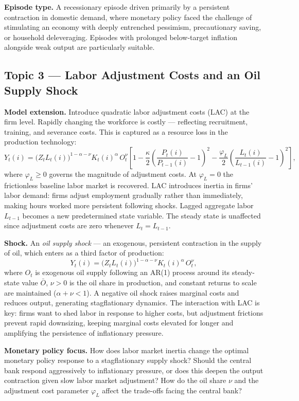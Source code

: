 \documentclass[11pt, a4paper]{article}
\begin{document}
\textbf{Episode type.} A recessionary episode driven primarily by a persistent
contraction in domestic demand, where monetary policy faced the challenge of
stimulating an economy with deeply entrenched pessimism, precautionary saving,
or household deleveraging. Episodes with prolonged below-target inflation
alongside weak output are particularly suitable.

\subsection{Topic 3 --- Labor Adjustment Costs and an Oil Supply Shock}

\textbf{Model extension.} Introduce quadratic labor adjustment costs (LAC) at
the firm level. Rapidly changing the workforce is costly --- reflecting
recruitment, training, and severance costs. This is captured as a resource loss
in the production technology:
\[
    Y_t(i) = \bigl(Z_t L_t(i)\bigr)^{1-\alpha-\nu}
    K_t(i)^\alpha\, O_t^\nu
    \left[1 - \frac{\kappa}{2}
    \left(\frac{P_t(i)}{P_{t-1}(i)} - 1\right)^{\!2}
    -\frac{\varphi_L}{2}
    \left(\frac{L_t(i)}{L_{t-1}(i)}-1\right)^{\!2}\right],
\]
where $\varphi_L \geq 0$ governs the magnitude of adjustment costs. At
$\varphi_L = 0$ the frictionless baseline labor market is recovered. LAC
introduces inertia in firms' labor demand: firms adjust employment gradually
rather than immediately, making hours worked more persistent following shocks.
Lagged aggregate labor $L_{t-1}$ becomes a new predetermined state variable.
The steady state is unaffected since adjustment costs are zero whenever
$L_t = L_{t-1}$.

\textbf{Shock.} An \textit{oil supply shock} --- an exogenous, persistent
contraction in the supply of oil, which enters as a third factor of production:
\[
    Y_t(i) = \bigl(Z_t L_t(i)\bigr)^{1-\alpha-\nu}
    K_t(i)^\alpha\, O_t^\nu,
\]
where $O_t$ is exogenous oil supply following an AR(1) process around its
steady-state value $\bar{O}$, $\nu > 0$ is the oil share in production, and
constant returns to scale are maintained ($\alpha+\nu < 1$). A negative oil
shock raises marginal costs and reduces output, generating stagflationary
dynamics. The interaction with LAC is key: firms want to shed labor in response
to higher costs, but adjustment frictions prevent rapid downsizing, keeping
marginal costs elevated for longer and amplifying the persistence of
inflationary pressure.

\textbf{Monetary policy focus.} How does labor market inertia change the
optimal monetary policy response to a stagflationary supply shock? Should the
central bank respond aggressively to inflationary pressure, or does this deepen
the output contraction given slow labor market adjustment? How do the oil share
$\nu$ and the adjustment cost parameter $\varphi_L$ affect the trade-offs
facing the central bank?
\end{document}
